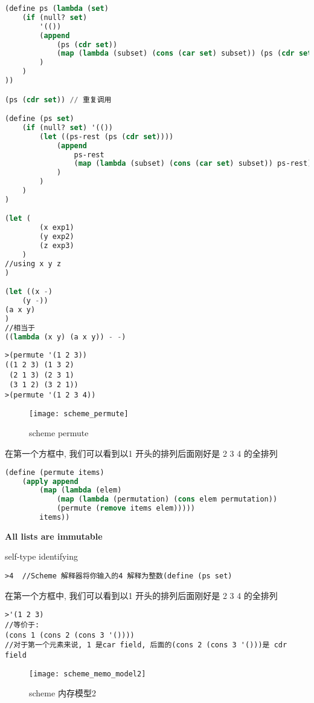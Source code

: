 \documentclass{article}
\begin{document}
\begin{lstlisting}[language = Lisp]
(define ps (lambda (set)
	(if (null? set)
		'(())
		(append
			(ps (cdr set))
			(map (lambda (subset) (cons (car set) subset)) (ps (cdr set)))
		)
	)
))

(ps (cdr set)) // 重复调用

(define (ps set)
	(if (null? set) '(())
		(let ((ps-rest (ps (cdr set))))
			(append
				ps-rest
				(map (lambda (subset) (cons (car set) subset)) ps-rest)
			)
		)
	)
)

(let (
		(x exp1)
		(y exp2)
		(z exp3)
	)
//using x y z
)

(let ((x -)
	(y -))
(a x y)
)
//相当于
((lambda (x y) (a x y)) - -)
\end{lstlisting}

\begin{verbatim}
>(permute '(1 2 3))
((1 2 3) (1 3 2)
 (2 1 3) (2 3 1)
 (3 1 2) (3 2 1))
>(permute '(1 2 3 4))
\end{verbatim}
\begin{figure}[htbp]
	\centering
	\texttt{[image: scheme\_permute]}\\
	\caption{scheme permute}\label{fig.scheme.permute}
\end{figure}

在第一个方框中, 我们可以看到以1 开头的排列后面刚好是 2 3 4 的全排列

\begin{lstlisting}[language = Lisp]
(define (permute items)
	(apply append
		(map (lambda (elem)
			(map (lambda (permutation) (cons elem permutation))
			(permute (remove items elem)))))
		items))
\end{lstlisting}

\textbf{All lists are immutable}

self-type identifying
\begin{verbatim}
>4  //Scheme 解释器将你输入的4 解释为整数(define (ps set)
\end{verbatim}
在第一个方框中, 我们可以看到以1 开头的排列后面刚好是 2 3 4 的全排列

\begin{verbatim}
>'(1 2 3)
//等价于:
(cons 1 (cons 2 (cons 3 '())))
//对于第一个元素来说, 1 是car field, 后面的(cons 2 (cons 3 '()))是 cdr field
\end{verbatim}
\begin{figure}[htbp]
	\centering
	\texttt{[image: scheme\_memo\_model2]}\\
	\caption{scheme 内存模型2}\label{fig.scheme.memo.model2}
\end{figure}
\end{document}
